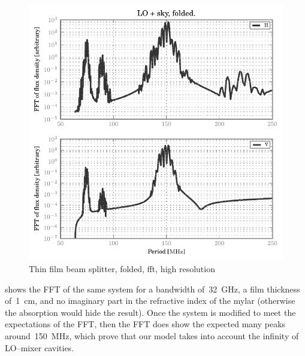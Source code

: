 \begin{figure}[hbtp]
    \centering
    \includegraphics{thin_film_beam_splitter_folded_fft_hr}
    \caption{Thin film beam splitter, folded, fft, high resolution}
    \label{fig:thin_film_beam_splitter_folded_fft_hr}
\end{figure}
 shows the FFT of the same system for a bandwidth of~\SI{32}{\giga\hertz}, a film thickness of~\SI{1}{\centi\meter}, and no imaginary part in the refractive index of the mylar (otherwise the absorption would hide the result).
Once the system is modified to meet the expectations of the FFT, then the FFT does show the expected many peaks around~\SI{150}{\mega\hertz}, which prove that our model takes into account the infinity of LO--mixer cavities.
